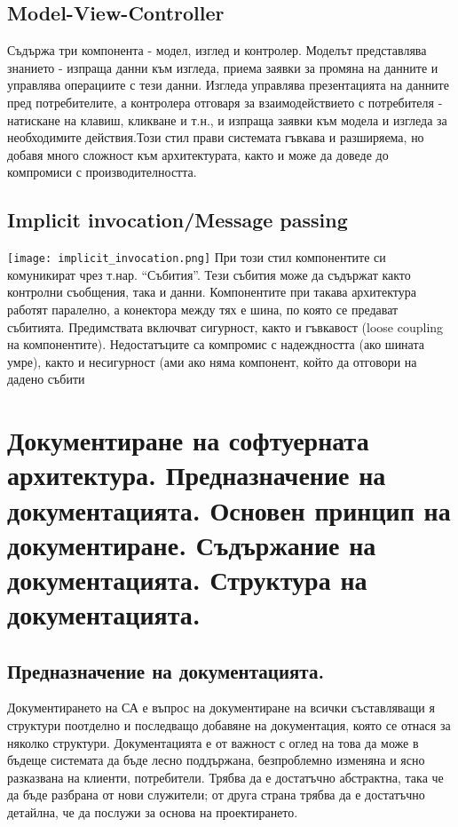 \documentclass[fleqn,12pt]{article}
\begin{document}
\subsection{Model-View-Controller}
Съдържа три компонента - модел, изглед и контролер.
Моделът представлява знанието - изпраща данни към изгледа, приема заявки за промяна на данните и управлява операциите с тези данни. Изгледа управлява презентацията на данните пред потребителите, а контролера отговаря за взаимодействието с потребителя - натискане на клавиш, кликване и т.н., и изпраща заявки към модела и изгледа за необходимите действия.Този стил прави системата гъвкава и разширяема, но добавя много сложност към архитектурата, както и може да доведе до компромиси с производителността.

\subsection{Implicit invocation/Message passing}
\texttt{[image: implicit\_invocation.png]}
При този стил компонентите си комуникират чрез т.нар. “Събития”. Тези събития може да съдържат както контролни съобщения, така и данни. Компонентите при такава архитектура работят паралелно, а конектора между тях е шина, по която се предават събитията. Предимствата включват сигурност, както и гъвкавост (loose coupling на компонентите). Недостатъците са компромис с надеждността (ако шината умре), както и несигурност (ами ако няма компонент, който да отговори на дадено събити

\section{Документиране на софтуерната архитектура. Предназначение на документацията. Основен принцип на документиране. Съдържание на документацията. Структура на документацията.}

\subsection{Предназначение на документацията.}
Документирането на СА е въпрос на документиране на всички съставляващи я структури поотделно и последващо добавяне на документация, която се отнася за няколко структури.
Документацията е от важност с оглед на това да може в бъдеще системата да бъде
лесно поддържана, безпроблемно изменяна и ясно разказвана на клиенти, потребители.
Трябва да е достатъчно абстрактна, така че да бъде разбрана от нови служители; от друга страна трябва да е достатъчно детайлна, че да послужи за основа на проектирането. 
\end{document}
